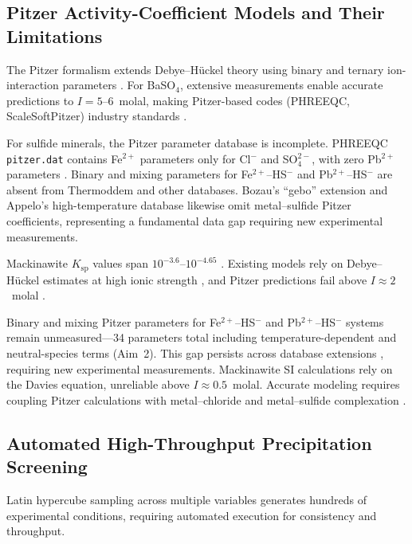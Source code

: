 \documentclass[12pt]{article}
\begin{document}
\subsection{Pitzer Activity-Coefficient Models and Their Limitations}

The Pitzer formalism extends Debye--H\"uckel theory using binary and ternary ion-interaction parameters \cite{kan2019}. For BaSO$_4$, extensive measurements enable accurate predictions to $I = 5$--6~molal, making Pitzer-based codes (PHREEQC, ScaleSoftPitzer) industry standards \cite{kan2019,shaferpeltier2020}.

For sulfide minerals, the Pitzer parameter database is incomplete. PHREEQC \texttt{pitzer.dat} contains Fe$^{2+}$ parameters only for Cl$^-$ and SO$_4^{2-}$, with zero Pb$^{2+}$ parameters \cite{wang2020}. Binary and mixing parameters for Fe$^{2+}$--HS$^-$ and Pb$^{2+}$--HS$^-$ are absent from Thermoddem and other databases. Bozau's ``gebo'' extension \cite{bozau2013} and Appelo's high-temperature database \cite{appelo2015} likewise omit metal--sulfide Pitzer coefficients, representing a fundamental data gap requiring new experimental measurements.

Mackinawite $K_{\text{sp}}$ values span $10^{-3.6}$--$10^{-4.65}$ \cite{wylde2014,wang2020}. Existing models rely on Debye--H\"uckel estimates at high ionic strength \cite{wang2020}, and Pitzer predictions fail above $I \approx 2$~molal \cite{felmy2000,alharbi2017}.

Binary and mixing Pitzer parameters for Fe$^{2+}$--HS$^-$ and Pb$^{2+}$--HS$^-$ systems remain unmeasured---34 parameters total including temperature-dependent and neutral-species terms (Aim~2). This gap persists across database extensions \cite{bozau2013,appelo2015}, requiring new experimental measurements. Mackinawite SI calculations rely on the Davies equation, unreliable above $I \approx 0.5$~molal. Accurate modeling requires coupling Pitzer calculations with metal--chloride and metal--sulfide complexation \cite{kan2019,felmy2000}.

\subsection{Automated High-Throughput Precipitation Screening}

Latin hypercube sampling across multiple variables generates hundreds of experimental conditions, requiring automated execution for consistency and throughput.
\end{document}
